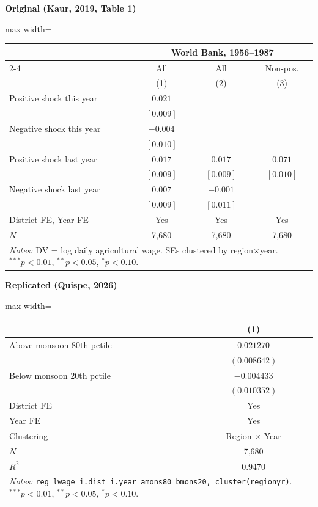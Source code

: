 \documentclass[11pt,a4paper]{article}
\begin{document}
\vspace{0.5cm}
\begin{minipage}[t]{0.48\textwidth}
\centering
\textbf{\large Original (Kaur, 2019, Table 1)}
\vspace{0.3cm}

\begin{adjustbox}{max width=\textwidth}
\begin{tabular}{lccc}
\toprule
 & \multicolumn{3}{c}{World Bank, 1956--1987} \\
\cmidrule(lr){2-4}
 & All & All & Non-pos. \\
 & (1) & (2) & (3) \\
\midrule
Positive shock this year & $0.021$ & & \\
 & $[0.009]$ & & \\[0.3em]
Negative shock this year & $-0.004$ & & \\
 & $[0.010]$ & & \\[0.3em]
Positive shock last year & $0.017$ & $0.017$ & $0.071$ \\
 & $[0.009]$ & $[0.009]$ & $[0.010]$ \\[0.3em]
Negative shock last year & $0.007$ & $-0.001$ & \\
 & $[0.009]$ & $[0.011]$ & \\[0.3em]
\midrule
District FE, Year FE & Yes & Yes & Yes \\
$N$ & 7,680 & 7,680 & 7,680 \\
\bottomrule
\multicolumn{4}{p{0.95\textwidth}}{\footnotesize\textit{Notes:} DV = log daily agricultural wage. SEs clustered by region$\times$year. $^{***}p<0.01$, $^{**}p<0.05$, $^{*}p<0.10$.}
\end{tabular}
\end{adjustbox}
\end{minipage}%
\hfill
\begin{minipage}[t]{0.48\textwidth}
\centering
\textbf{\large Replicated (Quispe, 2026)}
\vspace{0.3cm}

\begin{adjustbox}{max width=\textwidth}
\begin{tabular}{lc}
\toprule
 & (1) \\
\midrule
Above monsoon 80th pctile & $0.021270$ \\
 & $(0.008642)$ \\[0.3em]
Below monsoon 20th pctile & $-0.004433$ \\
 & $(0.010352)$ \\[0.3em]
\midrule
District FE & Yes \\
Year FE & Yes \\
Clustering & Region $\times$ Year \\
$N$ & 7,680 \\
$R^2$ & 0.9470 \\
\bottomrule
\multicolumn{2}{p{0.95\textwidth}}{\footnotesize\textit{Notes:} \texttt{reg lwage i.dist i.year amons80 bmons20, cluster(regionyr)}. $^{***}p<0.01$, $^{**}p<0.05$, $^{*}p<0.10$.}
\end{tabular}
\end{adjustbox}
\end{minipage}
\end{document}
